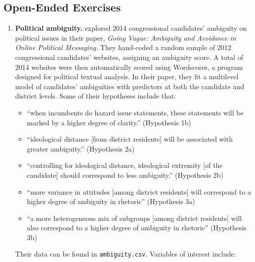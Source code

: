 \documentclass[
]{krantz}
\providecommand{\tightlist}{%
  \setlength{\itemsep}{0pt}\setlength{\parskip}{0pt}}
\begin{document}
\hypertarget{open-ended-exercises-4}{%
\subsection{Open-Ended Exercises}\label{open-ended-exercises-4}}

\begin{enumerate}
\def\labelenumi{\arabic{enumi}.}
\item
  \textbf{Political ambiguity.} \citet{Chapp2018} explored 2014 congressional candidates' ambiguity on political issues in their paper, \emph{Going Vague: Ambiguity and Avoidance in Online Political Messaging}. They hand-coded a random sample of 2012 congressional candidates' websites, assigning an ambiguity score. A total of 2014 websites were then automatically scored using Wordscores, a program designed for political textual analysis. In their paper, they fit a multilevel model of candidates' ambiguities with predictors at both the candidate and district levels. Some of their hypotheses include that:

  \begin{itemize}
  \tightlist
  \item
    ``when incumbents do hazard issue statements, these statements will be marked by a higher degree of clarity.'' (Hypothesis 1b)
  \item
    ``ideological distance {[}from district residents{]} will be associated with greater ambiguity.'' (Hypothesis 2a)
  \item
    ``controlling for ideological distance, ideological extremity {[}of the candidate{]} should correspond to less ambiguity.'' (Hypothesis 2b)
  \item
    ``more variance in attitudes {[}among district residents{]} will correspond to a higher degree of ambiguity in rhetoric'' (Hypothesis 3a)
  \item
    ``a more heterogeneous mix of subgroups {[}among district residents{]} will also correspond to a higher degree of ambiguity in rhetoric'' (Hypothesis 3b)
  \end{itemize}

  Their data can be found in \texttt{ambiguity.csv}. Variables of interest include:


\end{enumerate}
\end{document}
